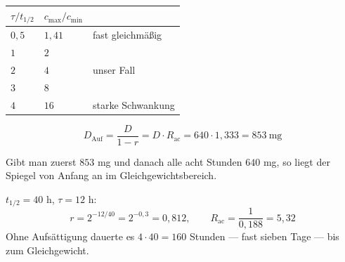 \begin{merksatz}
\begin{center}
\begin{minipage}{0.88\textwidth}
\end{minipage}
\end{center}

\begin{center}
\renewcommand{\arraystretch}{1.45}
\begin{tabular}{@{}P{2.4cm}P{2.2cm}P{2.6cm}@{}}
\toprule
$\tau/t_{1/2}$ & $c_{\max}/c_{\min}$ & \\
\midrule
$0{,}5$ & $1{,}41$ & \textcolor{gruen}{fast gleichmäßig}\\
$1$ & $2$ & \\
$2$ & $4$ & unser Fall\\
$3$ & $8$ & \\
$4$ & $16$ & \textcolor{akzent}{starke Schwankung}\\
\bottomrule
\end{tabular}
\end{center}
\end{merksatz}

\begin{merksatz}
\[ D_{\text{Auf}} = \frac{D}{1-r} = D \cdot R_{\text{ac}} = 640 \cdot 1{,}333 = 853\ \mathrm{mg} \]

Gibt man zuerst $853$ mg und danach alle acht Stunden $640$ mg, so liegt der Spiegel von Anfang an im Gleichgewichtsbereich.

\begin{center}
\begin{minipage}{0.88\textwidth}
\end{minipage}
\end{center}

$t_{1/2} = 40$ h, $\tau = 12$ h:
\[ r = 2^{-12/40} = 2^{-0{,}3} = 0{,}812, \qquad R_{\text{ac}} = \frac{1}{0{,}188} = 5{,}32 \]
Ohne Aufsättigung dauerte es $4 \cdot 40 = 160$ Stunden --- fast sieben Tage --- bis zum Gleichgewicht.
\end{merksatz}

